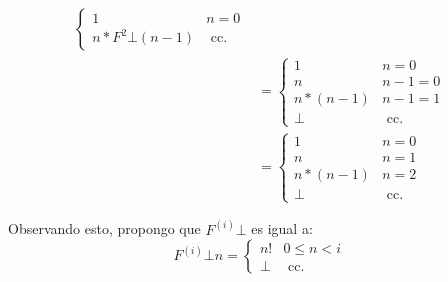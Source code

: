 \documentclass{article}
\begin{document}
\begin{equation*}
\begin{aligned}
\begin{cases}
			               1                   & n = 0        \\
			               n * F^2 \bot(n - 1) & \text{ cc. }
		               \end{cases} \\
		           & = \begin{cases}
			               1         & n = 0        \\
			               n         & n-1 = 0      \\
			               n * (n-1) & n-1 = 1      \\
			               \bot      & \text{ cc. }
		               \end{cases}           \\
		           & = \begin{cases}
			               1           & n = 0        \\
			               n           & n = 1        \\
			               n * (n - 1) & n = 2        \\
			               \bot        & \text{ cc. }
		               \end{cases}
	\end{aligned}
\end{equation*}

Observando esto, propongo que $F^{(i)} \bot$ es igual a:
\begin{equation*}
	F^{(i)} \bot n = \begin{cases}
		n!   & 0 \leq n < i \\
		\bot & \text{ cc. }
	\end{cases}
\end{equation*}
\end{document}
